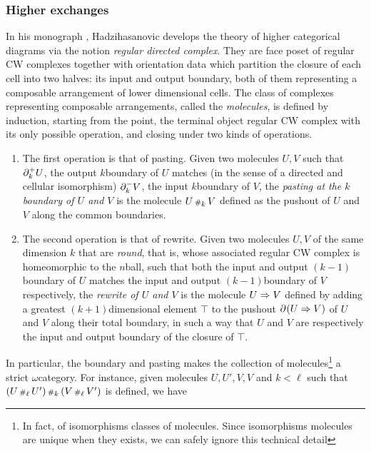 \subsubsection*{Higher exchanges}

In his monograph \cite{hadzihasanovic2024combinatorics}, Hadzihasanovic develops the theory of higher categorical diagrams via the notion \emph{regular directed complex}.
They are face poset of regular CW complexes together with orientation data which partition the closure of each cell into two halves: its input and output boundary, both of them representing a composable arrangement of lower dimensional cells.
The class of complexes representing composable arrangements, called the \emph{molecules}, is defined by induction, starting from the point, the terminal object regular CW complex with its only possible operation, and closing under two kinds of operations.
\begin{enumerate}
    \item The first operation is that of pasting. Given two molecules \( U, V \) such that \( \partial_{k}^{+} U \), the output \( k \)\nbd boundary of \( U \) matches (in the sense of a directed and cellular isomorphism) \( \partial_{k}^{-} V \), the input \( k \)\nbd boundary of \( V \), the \emph{pasting at the \( k \)\nbd boundary of \( U \) and \( V \)} is the molecule \( U \,{\scriptstyle\#}_{k}\, V \) defined as the pushout of \( U \) and \( V \) along the common boundaries. 
    \item The second operation is that of rewrite.
    Given two molecules \( U, V \) of the same dimension \( k \) that are \emph{round}, that is, whose associated regular CW complex is homeomorphic to the \( n \)\nbd ball, such that both the input and output \( (k - 1) \)\nbd boundary of \( U \) matches the input and output \( (k - 1) \)\nbd boundary of \( V \) respectively, the \emph{rewrite of \( U \) and \( V \)} is the molecule \( U \Rightarrow V \) defined by adding a greatest \( (k + 1) \)\nbd dimensional element \( \top \) to the pushout \( \partial_{}^{}(U \Rightarrow V) \) of \( U \) and \( V \) along their total boundary, in such a way that \( U \) and \( V \) are respectively the input and output boundary of the closure of \( \top \).
\end{enumerate}  
In particular, the boundary and pasting makes the collection of molecules\footnote{In fact, of isomorphisms classes of molecules. Since isomorphisms molecules are unique when they exists, we can safely ignore this technical detail} a strict \( \omega \)\nbd category.
For instance, given molecules \( U, U', V, V \) and \( k < \ell \) such that \( (U \,{\scriptstyle\#}_{\ell}\, U') \,{\scriptstyle\#}_{k}\, (V \,{\scriptstyle\#}_{\ell}\, V') \) is defined, we have
